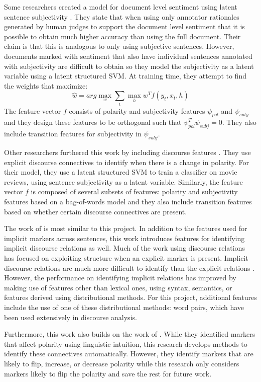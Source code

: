 \documentclass[11pt,letterpaper]{article}
\begin{document}
Some researchers created a model for document level sentiment using latent sentence subjectivity \cite{Yesselina}.
They state that when using only annotator rationales generated by human judges to support the document level sentiment that
it is possible to obtain much higher accuracy than using the full document.
Their claim is that this is analogous to only using subjective sentences.  However, documents marked with sentiment that also
have individual sentences annotated with subjectivity are difficult to obtain so they model the subjectivity as a latent variable using
a latent structured SVM.  
At training time, they attempt to find the weights that maximize:
$$\hat{w} = arg \max_w \sum_t \max_h w^T f(y_t, x_t, h)$$
The feature vector $f$ consists of polarity and subjectivity features $\psi_{pol}$ and $\psi_{subj}$ and they design these features to be orthogonal such that $\psi_{pol}^T\psi_{subj}=0$.
They also include transition features for subjectivity in $\psi_{subj}$.

Other researchers furthered this work by including discourse features \cite{Trivedi}.
They use explicit discourse connectives to identify when there is a change in polarity.
For their model, they use a latent structured SVM to train a classifier on movie reviews, using sentence subjectivity as a latent variable.
Similarly, the feature vector $f$ is composed of several subsets of features: polarity and subjectivity features based on a bag-of-words model and they also include
transition features based on whether certain discourse connectives are present.

The work of \cite{Trivedi} is most similar to this project.  In addition to the features used for implicit markers across sentences,
this work introduces features for identifying implicit discourse relations as well.
Much of the work using discourse relations has focused on exploiting structure when an explicit marker is present.  Implicit discourse 
relations are much more difficult to identify than the explicit relations \cite{Pitler:2009b}. However, the performance on identifying implicit 
relations has improved by making use of features other than lexical ones, using syntax, semantics, or features derived using distributional methods.
For this project, additional features include the use of one of these distributional methods: word pairs, which have been used extensively in discourse analysis.

Furthermore, this work also builds on the work of \cite{Mukherjee}.  While they identified markers that affect polarity using linguistic intuition, this
research develops methods to identify these connectives automatically.  However, they identify markers that are likely to flip, increase, or decrease
polarity while this research only considers markers likely to flip the polarity and save the rest for future work.
\end{document}
